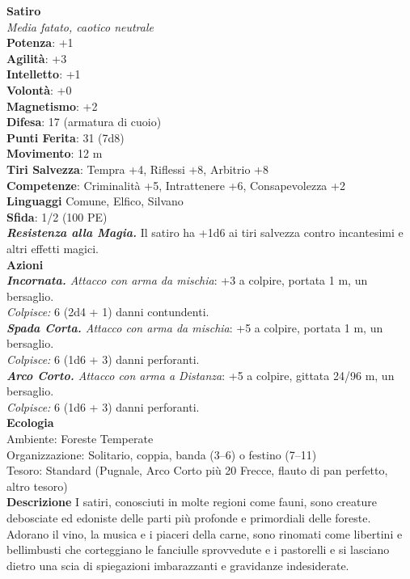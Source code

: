 \begin{multicols}{2}
\medskip\textbf{Satiro}\\
\emph{Media fatato, caotico neutrale}\\
\textbf{Potenza}: +1\\
\textbf{Agilità}: +3\\
\textbf{Intelletto}: +1\\
\textbf{Volontà}: +0\\
\textbf{Magnetismo}: +2\\
\textbf{Difesa}: 17 (armatura di cuoio)\\
\textbf{Punti Ferita}: 31 (7d8)\\
\textbf{Movimento}: 12 m\\
\textbf{Tiri Salvezza}: Tempra +4, Riflessi +8, Arbitrio +8\\
\textbf{Competenze}: Criminalità +5, Intrattenere +6, Consapevolezza +2\\
\textbf{Linguaggi} Comune, Elfico, Silvano\\
\textbf{Sfida}: 1/2 (100 PE)\smallskip\\
\emph{\textbf{Resistenza alla Magia.}} Il satiro ha +1d6 ai tiri salvezza contro incantesimi e altri effetti magici.\\
\smallskip\textbf{Azioni}\\
\emph{\textbf{Incornata.} Attacco con arma da mischia}: +3 a colpire, portata 1 m, un bersaglio.\\
\emph{Colpisce:} 6 (2d4 + 1) danni contundenti.\\
\emph{\textbf{Spada Corta.} Attacco con arma da mischia}: +5 a colpire, portata 1 m, un bersaglio.\\
\emph{Colpisce:} 6 (1d6 + 3) danni perforanti.\\
\emph{\textbf{Arco Corto.} Attacco con arma a Distanza}: +5 a colpire, gittata 24/96 m, un bersaglio.\\
\emph{Colpisce:} 6 (1d6 + 3) danni perforanti.\\
\textbf{Ecologia}\\
Ambiente: Foreste Temperate\\
Organizzazione: Solitario, coppia, banda (3–6) o festino (7–11)\\
Tesoro: Standard (Pugnale, Arco Corto più 20 Frecce, flauto di pan perfetto, altro tesoro)\\
\textbf{Descrizione}
I satiri, conosciuti in molte regioni come fauni, sono creature debosciate ed edoniste delle parti più profonde e primordiali delle foreste. Adorano il vino, la musica e i piaceri della carne, sono rinomati come libertini e bellimbusti che corteggiano le fanciulle sprovvedute e i pastorelli e si lasciano dietro una scia di spiegazioni imbarazzanti e gravidanze indesiderate.\\


\end{multicols}
